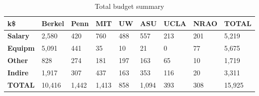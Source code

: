 

\begin{table}[h]
\centering
\caption{Total budget summary}
\label{tab:expenses}
\begin{tabular}{| p{0.5in} | p{.6in} |  p{.6in} |  p{.6in} |  p{.6in} |  p{.6in} |  p{.6in} |  p{.6in} |  p{.6in} | }\hline
  k\$   & \textbf{Berkel} & \textbf{Penn} & \textbf{MIT} & \textbf{UW} & \textbf{ASU} & \textbf{UCLA} & \textbf{NRAO} & \textbf{TOTAL}\\\hline
\textbf{Salary}&       2,580  &         420  &         760  &         488  &         557  &         213  &         201  &       5,219  \\\hline
\textbf{Equipm}&       5,091  &         441  &          35  &          10  &          21  &           0  &          77  &       5,675  \\\hline
\textbf{Other}&         828  &         274  &         181  &         197  &         163  &          65  &          10  &       1,719  \\\hline
\textbf{Indire}&       1,917  &         307  &         437  &         163  &         353  &         116  &          20  &       3,311  \\\hline
\textbf{TOTAL}&      10,416  &       1,442  &       1,413  &         858  &       1,094  &         393  &         308  &      15,925  \\\hline
\end{tabular}
\end{table}
